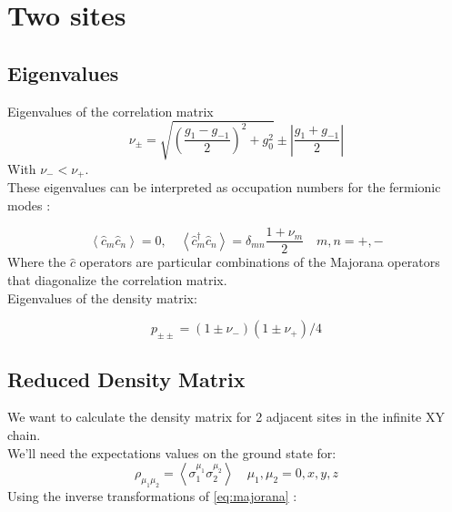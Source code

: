 \documentclass[12pt,a4paper]{book}
\theoremstyle{definition}
\begin{document}
\clearpage
\section{Two sites}

\subsection{Eigenvalues}
Eigenvalues of the correlation matrix
\begin{equation}
	\nu_{\pm}=\sqrt{\left(\frac{g_{1}-g_{-1}}{2}\right)^{2}+g_{0}^{2}} \pm \left| \frac{g_{1}+g_{-1}}{2} \right|
\end{equation}
With $\nu_-<\nu_+$.\\
These eigenvalues can be interpreted as occupation numbers for the fermionic modes  \cite{Franchini_2014} \cite{latorre2003ground}:

\begin{equation}
	\left\langle\hat{c}_{m} \hat{c}_{n}\right\rangle=0, \quad\left\langle\hat{c}_{m}^{\dagger} \hat{c}_{n}\right\rangle=\delta_{m n} \frac{1+\nu_{m}}{2} \quad m,n=+,-
\end{equation}
Where the $\hat{c}$ operators are particular combinations of the Majorana operators that diagonalize the correlation matrix.\\
Eigenvalues of the density matrix:

\begin{equation}
	p_{\pm \pm } =(1 \pm \nu_-)(1 \pm \nu_+)/4
\end{equation}

\subsection{Reduced Density Matrix}
	We want to calculate the density matrix for 2 adjacent sites in the infinite XY chain.\\ We'll need the expectations values on the ground state for:
\begin{equation}\label{eq:2sitepauli}
	\rho_{\mu_{1}  \mu_{2}}=\left\langle\sigma_{1}^{\mu_{1}}  \sigma_{2}^{\mu_{2}}\right\rangle \quad \mu_{1},\mu_{2}=0, x, y, z
\end{equation}
Using the inverse transformations of \ref{eq:majorana} :
\end{document}

